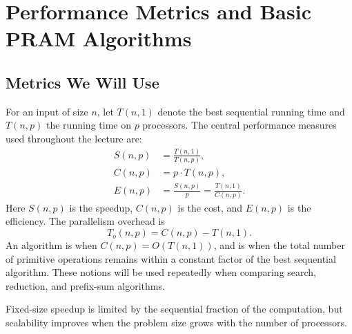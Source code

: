 \newcommand{\scribefigureplaceholder}[2]{%
\begin{figure}[ht]
  \centering
  \fbox{%
    \parbox[c][2.3in][c]{0.84\textwidth}{%
      \centering
      \textbf{Illustration Placeholder}\\[0.5em]
      #2
    }%
  }
  \caption{#1}
\end{figure}
}

\newcommand{\scribecodeplaceholder}[2]{%
\begin{ppprogram}{#1}{#2}
  \centering
  \fbox{%
    \parbox[c][2.5in][c]{0.90\linewidth}{%
      \centering
      \textbf{Code Placeholder}\\[0.5em]
      Insert the final code or pseudocode from the lecture demo here.
    }%
  }
\end{ppprogram}
}

\chapter{Performance Metrics and Basic PRAM Algorithms}

\section{Metrics We Will Use}
For an input of size $n$, let $T(n,1)$ denote the best sequential running time
and $T(n,p)$ the running time on $p$ processors. The central performance measures
used throughout the lecture are:
\begin{align*}
S(n,p) &= \frac{T(n,1)}{T(n,p)}, \\
C(n,p) &= p \cdot T(n,p), \\
E(n,p) &= \frac{S(n,p)}{p} = \frac{T(n,1)}{C(n,p)}.
\end{align*}
Here $S(n,p)$ is the speedup, $C(n,p)$ is the cost, and $E(n,p)$ is the efficiency.
The parallelism overhead is
\[
T_o(n,p) = C(n,p) - T(n,1).
\]
An algorithm is  when $C(n,p) = O(T(n,1))$, and is
 when the total number of primitive operations remains
within a constant factor of the best sequential algorithm. These notions will
be used repeatedly when comparing search, reduction, and prefix-sum algorithms.

\begin{ppkey}
 Fixed-size speedup is limited by the sequential fraction of the computation,
but scalability improves when the problem size grows with the number of processors.
\end{ppkey}

